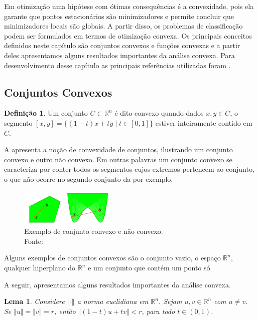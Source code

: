 \documentclass[12pt,a4paper]{scrartcl}
\def\RR{\mathds{R}}
\newtheorem{lema}{Lema}
\theoremstyle{definition}%
\newtheorem{defi}{Definição}
\begin{document}
Em otimização uma hipótese com ótimas consequências é a convexidade, pois ela garante que pontos estacionários são minimizadores e permite concluir que minimizadores locais são globais. A partir disso, os problemas de classificação podem ser formulados em termos de otimização convexa.
Os principais conceitos definidos neste capítulo são conjuntos convexos e funções convexas e a partir deles apresentamos alguns resultados importantes da análise convexa. Para desenvolvimento desse capítulo as principais referências utilizadas foram \textcite{Evelin2017,Ademir2013,Izmailov2014ac}.


\subsection{Conjuntos Convexos}

\begin{defi} 
Um conjunto $C \subset \RR^{n}$ é dito convexo quando dados $x,y \in C$, o segmento $[x,y] = \{ (1-t)x + ty \mid t\in [0,1] \}$ estiver inteiramente contido em $C$.
\end{defi}

A  apresenta a noção de convexidade de conjuntos, ilustrando um conjunto convexo e outro não convexo. Em outras palavras um conjunto convexo se caracteriza por conter todos os segmentos cujos extremos pertencem ao conjunto, o que não ocorre no segundo conjunto da  por exemplo.


\begin{figure}[!h] 
	\centering
	\includegraphics[width=0.40\textwidth]{conjunto_convexo}
	\caption{ Exemplo de conjunto convexo e não convexo. \label{fig:conjuntos_convexos} \\ Fonte: \textcite{Evelin2017}}
\end{figure}


Alguns exemplos de conjuntos convexos são o conjunto vazio, o espaço $\RR^{n}$, qualquer hiperplano do $\RR^{n}$ e um conjunto que contém um ponto só.

A seguir, apresentamos alguns resultados importantes da análise convexa.

\begin{lema} \label{lema:1_convexidade}
Considere $\Vert \cdot \Vert$ a norma euclidiana em $\RR^{n}$. Sejam $u,v \in \RR^{n}$ com $u\neq v$. Se $\Vert u \Vert = \Vert v \Vert = r$, então $\Vert (1-t)u + tv \Vert < r$, para todo $t \in (0,1)$.
\end{lema}
\end{document}
